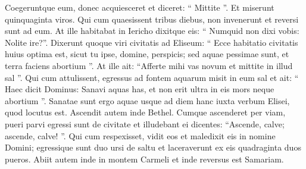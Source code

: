 \begin{biblechapter}
\begin{biblechapter}
\verse Coegeruntque eum, donec acquiesceret et diceret: “ Mittite ”. Et miserunt quinquaginta viros. Qui cum quaesissent tribus diebus, non invenerunt 
\verse et reversi sunt ad eum. At ille habitabat in Iericho dixitque eis: “ Numquid non dixi vobis: Nolite ire?”.
 \verse Dixerunt quoque viri civitatis ad Eliseum: “ Ecce habitatio civitatis huius optima est, sicut tu ipse, domine, perspicis; sed aquae pessimae sunt, et terra faciens abortium ”. 
\verse At ille ait: “Afferte mihi vas novum et mittite in illud sal ”. Qui cum attulissent, 
\verse egressus ad fontem aquarum misit in eum sal et ait: “ Haec dicit Dominus: Sanavi aquas has, et non erit ultra in eis mors neque abortium ”. 
\verse Sanatae sunt ergo aquae usque ad diem hanc iuxta verbum Elisei, quod locutus est.
 \verse Ascendit autem inde Bethel. Cumque ascenderet per viam, pueri parvi egressi sunt de civitate et illudebant ei dicentes: “Ascende, calve; ascende, calve! ”. 
 \verse Qui cum respexisset, vidit eos et maledixit eis in nomine Domini; egressique sunt duo ursi de saltu et laceraverunt ex eis quadraginta duos pueros. 
\verse Abiit autem inde in montem Carmeli et inde reversus est Samariam.
 

\end{biblechapter}
\end{biblechapter}
